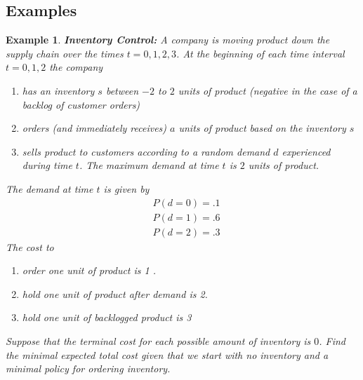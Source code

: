 \documentclass[12pt]{amsart}
\newtheorem{exm}[thm]{Example}
\begin{document}
\subsection{Examples}

\begin{exm}{\textbf{Inventory Control:}} 
A company is moving product down the supply chain over the times $t=0, 1, 2, 3$. At the beginning of each time interval $t = 0, 1, 2$ the company 

\begin{enumerate}
\item has an inventory $s$ between $-2$ to $2$ units of product (negative in the case of a backlog of customer orders) 
\item orders (and immediately receives) $a$ units of product based on the inventory $s$
\item sells product to customers according to a random demand $d$ experienced during time $t$. The maximum demand at time $t$ is $2$ units of product.
\end{enumerate}
The demand at time $t$ is given by
\begin{align*}
&P(d=0) = .1\\
&P(d=1) = .6\\
&P(d=2) = .3
\end{align*} 
The cost to
\begin{enumerate}
\item  order one unit of product is 1 .
\item  hold one unit of product after demand is 2.
\item  hold one unit of backlogged product is 3
\end{enumerate}
Suppose that the terminal cost for each possible amount of inventory is $0$. Find the minimal expected total cost given that we start with no inventory and a minimal policy for ordering inventory.
\end{exm}
\end{document}
